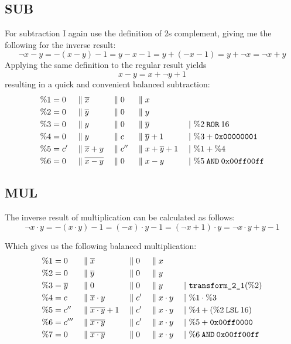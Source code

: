 \subsection{SUB}
For subtraction I again use the definition of 2s complement, giving me the following for the inverse result:
\begin{equation*}
  \neg{x-y} = - (x-y) - 1 = y - x - 1 = y + (-x -1) = y + \neg{x} = \neg{x} + y
\end{equation*}
Applying the same definition to the regular result yields
\begin{equation*}
  x-y = x + \neg{y} + 1
\end{equation*}
resulting in a quick and convenient balanced subtraction:
\begin{align*}
  \%1 &= 0 &&\; \| \; \overline{x} &&\; \| \; 0 &&\; \| \; x &&\\
  \%2 &= 0 &&\; \| \; \overline{y} &&\; \| \; 0 &&\; \| \; y &&\\
  \%3 &= 0 &&\; \| \; y &&\; \| \; 0 &&\; \| \; \overline{y} && \;|\ \%2 \mathbin{\texttt{ROR}} 16\\
  \%4 &= 0 &&\; \| \; y &&\; \| \; c &&\; \| \; \overline{y}+1 && \;|\ \%3 + \texttt{0x00000001}\\
  \%5 &= c' &&\; \| \; \overline{x}+y &&\; \| \; c'' &&\; \| \; x+\overline{y}+1 && \;|\ \%1 + \%4\\
  \%6 &= 0 &&\; \| \; \overline{x-y} &&\; \| \; 0 &&\; \| \; x-y && \;|\ \%5 \mathbin{\texttt{AND}} \texttt{0x00ff00ff}
\end{align*}

\subsection{MUL}
The inverse result of multiplication can be calculated as follows:
\begin{equation*}
  \neg{x \cdot y} = -(x \cdot y) - 1 = (-x) \cdot y - 1 = (\neg{x} + 1) \cdot y = \neg{x} \cdot y + y - 1
\end{equation*}

Which gives us the following balanced multiplication:
\begin{align*}
  \%1 &= 0 &&\; \| \; \overline{x} &&\; \| \; 0 &&\; \| \; x &&\\
  \%2 &= 0 &&\; \| \; \overline{y} &&\; \| \; 0 &&\; \| \; y &&\\
  \%3 &= \overline{y} &&\; \| \; 0 &&\; \| \; 0 &&\; \| \; y && \;|\ \texttt{transform\_2\_1}(\%2)\\
  \%4 &= c &&\; \| \; \overline{x}\cdot y &&\; \| \; c' &&\; \| \; x \cdot y && \;|\ \%1 \cdot \%3\\
  \%5 &= c'' &&\; \| \; \overline{x \cdot y} +1 &&\; \| \; c' &&\; \| \; x \cdot y && \;|\ \%4 + (\%2 \mathbin{\texttt{LSL}} 16)\\
  \%6 &= c''' &&\; \| \; \overline{x \cdot y} &&\; \| \; c' &&\; \| \; x \cdot y && \;|\ \%5 + \texttt{0x00ff0000}\\
  \%7 &= 0 &&\; \| \; \overline{x \cdot y} &&\; \| \; 0 &&\; \| \; x \cdot y && \;|\ \%6 \mathbin{\texttt{AND}} \texttt{0x00ff00ff}
\end{align*}

